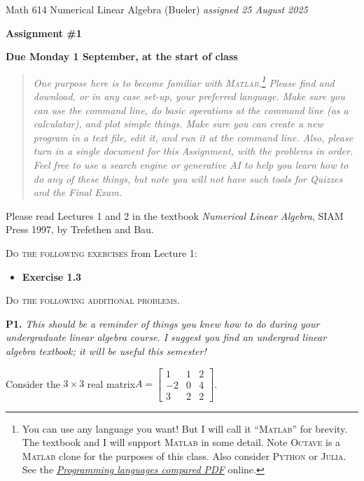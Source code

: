 \documentclass[12pt]{amsart}
\newcommand{\prob}[1]{\bigskip\noindent\textbf{#1.}\quad }
\newcommand{\Matlab}{\textsc{Matlab}\xspace}
\newcommand{\Octave}{\textsc{Octave}\xspace}
\newcommand{\Python}{\textsc{Python}\xspace}
\newcommand{\Julia}{\textsc{Julia}\xspace}
\begin{document}
\scriptsize \noindent Math 614 Numerical Linear Algebra (Bueler) \hfill \emph{assigned 25 August 2025}
\normalsize\medskip

\Large\centerline{\textbf{Assignment \#1}}
\large
\medskip

\centerline{\textbf{Due Monday 1 September, at the start of class}}
\medskip
\normalsize

\thispagestyle{empty}

\bigskip

\begin{quote}
{\small \emph{One purpose here is to become familiar with \Matlab.\footnote{You can use any language you want!  But I will call it ``\Matlab'' for brevity.  The textbook and I will support \Matlab in some detail.  Note \Octave is a \Matlab clone for the purposes of this class.  Also consider \Python or \Julia.  See the \href{https://bueler.github.io/compareMOP.pdf}{\emph{Programming languages compared PDF}} online.}  Please find and download, or in any case set-up, your preferred language.  Make sure you can use the command line, do basic operations at the command line (as a calculator), and plot simple things.  Make sure you can create a new program in a text file, edit it, and run it at the command line. Also, please turn in a single document for this Assignment, with the problems in order.  Feel free to use a search engine or generative AI to help you learn how to do any of these things, but note you will not have such tools for Quizzes and the Final Exam.}}
\end{quote}

\bigskip
\noindent Please read Lectures 1 and 2 in the textbook \emph{Numerical Linear Algebra}, SIAM Press 1997, by Trefethen and Bau.

\bigskip
\noindent \textsc{Do the following exercises} from Lecture 1:

\begin{itemize}
\item \textbf{Exercise 1.3}
\end{itemize}


\medskip
\noindent \textsc{Do the following additional problems.}

\prob{P1}  \emph{This should be a reminder of things you knew how to do during your undergraduate linear algebra course.  I suggest you find an undergrad linear algebra textbook; it will be useful this semester!}

\smallskip
Consider the $3\times 3$ real matrix\quad $A = \begin{bmatrix}   1     &     1    &     2 \\
                            -2    &     0    &     4 \\
                            3     &     2    &     2  \end{bmatrix}$.
\end{document}
